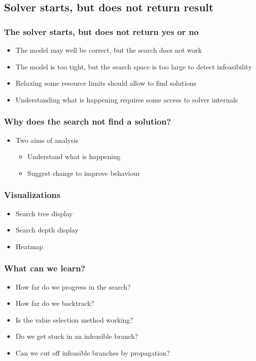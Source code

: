 \documentclass[dvipsnames,aspectratio=169]{beamer}
\begin{document}
\subsection{Solver starts, but does not return result}

\begin{frame}
\frametitle{The solver starts, but does not return yes or no}
\begin{itemize}
\item The model may well be correct, but the search does not work
\item The model is too tight, but the search space is too large to detect infeasibility
\item Relaxing some resource limits should allow to find solutions
\item Understanding what is happening requires some access to solver internals
\end{itemize}
\end{frame}

\begin{frame}
\frametitle{Why does the search not find a solution?}
\begin{itemize}
\item Two aims of analysis
\begin{itemize}
\item Understand what is happening
\item Suggest change to improve behaviour
\end{itemize}
\end{itemize}
\end{frame}


\begin{frame}
  \frametitle{Visualizations}
  \begin{itemize}
  \item Search tree display
  \item Search depth display
  \item Heatmap
  \end{itemize}
\end{frame}

\begin{frame}
  \frametitle{What can we learn?}
    \begin{itemize}
    \item How far do we progress in the search?
    \item How far do we backtrack?
    \item Is the value selection method working?
    \item Do we get stuck in an infeasible branch?
      \item Can we cut off infeasible branches by propagation?
    \end{itemize}
\end{frame}
\end{document}
